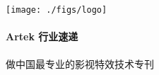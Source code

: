 \begin{titlepage}
\begin{center}




\texttt{[image: ./figs/logo]}~\\[1cm]

\HRule \\[1cm]
{ \huge \bfseries Artek 行业速递}\\[0.4cm]
\HRule \\[1cm]

\textsc{\Large 做中国最专业的影视特效技术专刊}\\[0.5cm]
\vspace{1in}



\renewcommand\contentsname{目录}

\tableofcontents


\setcounter{tocdepth}{1}
\end{center}



\end{titlepage}
